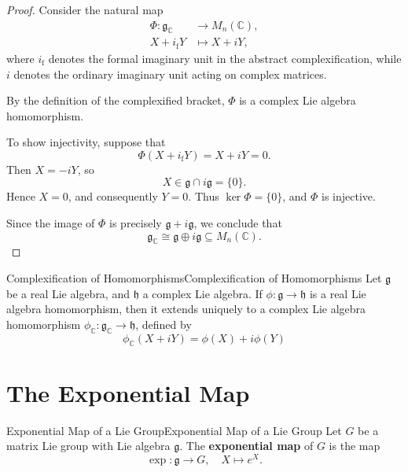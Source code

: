 \documentclass[../main.tex]{subfiles}
\begin{document}
\begin{proof}
  Consider the natural map
  \begin{equation}
    \begin{aligned}
      \Phi:\mathfrak{g}_{\mathbb{C}}
      &\longrightarrow M_n(\mathbb{C}),\\
      X+i_{\mathrm{f}}Y
      &\longmapsto X+iY,
    \end{aligned}
  \end{equation}
  where $i_{\mathrm{f}}$ denotes the formal imaginary unit in the abstract complexification, while $i$ denotes the ordinary imaginary unit acting on complex matrices.

  By the definition of the complexified bracket, $\Phi$ is a complex Lie algebra homomorphism.

  To show injectivity, suppose that
  \begin{equation}
    \Phi(X+i_{\mathrm{f}}Y)=X+iY=0.
  \end{equation}
  Then $X=-iY$, so
  \begin{equation}
    X\in\mathfrak{g}\cap i\mathfrak{g}=\{0\}.
  \end{equation}
  Hence $X=0$, and consequently $Y=0$. Thus $\ker\Phi=\{0\}$, and $\Phi$ is injective.

  Since the image of $\Phi$ is precisely $\mathfrak{g}+i\mathfrak{g}$, we conclude that
  \begin{equation}
    \boxed{
      \mathfrak{g}_{\mathbb{C}}
      \cong\mathfrak{g}\oplus i\mathfrak{g}
      \subseteq M_n(\mathbb{C}).
    }
  \end{equation}
\end{proof}

\begin{proposition}{Complexification of Homomorphisms}{Complexification of Homomorphisms}
  Let $\mathfrak{g}$ be a real Lie algebra, and $\mathfrak{h}$ a complex Lie algebra. If $\phi:\mathfrak{g}\to\mathfrak{h}$ is a real Lie algebra homomorphism, then it extends uniquely to a complex Lie algebra homomorphism $\phi_{\mathbb{C}}:\mathfrak{g}_{\mathbb{C}}\to\mathfrak{h}$, defined by
  \begin{equation}
    \phi_{\mathbb{C}}(X+iY)=\phi(X)+i\phi(Y)
  \end{equation}
\end{proposition}

\section{The Exponential Map}
\begin{definition}{Exponential Map of a Lie Group}{Exponential Map of a Lie Group}
  Let $G$ be a matrix Lie group with Lie algebra $\mathfrak{g}$. The \textbf{exponential map} of $G$ is the map
  \begin{equation}
    \exp:\mathfrak{g}\to G,\quad X\mapsto e^X.
  \end{equation}
\end{definition}
\end{document}
